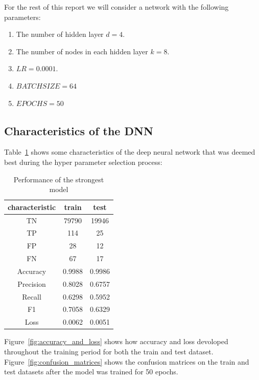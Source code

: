 \documentclass[utf8x]{ctexart}
\begin{document}
For the rest of this report we will consider a network with the following parameters:
\begin{enumerate}
  \item The number of hidden layer $d = 4$.
  \item The number of nodes in each hidden layer $k = 8$.
  \item $LR = 0.0001$.
  \item $BATCH SIZE = 64$
  \item $EPOCHS = 50$
\end{enumerate}

\subsection{Characteristics of the DNN}

Table~\ref{tab:chars} shows some characteristics of the deep neural network that was deemed best during the hyper parameter selection process:

\begin{table}[ht]
  \centering
  \caption{Performance of the strongest model}
  \label{tab:chars}
  \begin{tabular}{c|cc}
    characteristic & train  & test   \\
    \hline
    TN             & 79790  & 19946  \\
    TP             & 114    & 25     \\
    FP             & 28     & 12     \\
    FN             & 67     & 17     \\
    Accuracy       & 0.9988 & 0.9986 \\
    Precision      & 0.8028 & 0.6757 \\
    Recall         & 0.6298 & 0.5952 \\
    F1             & 0.7058 & 0.6329 \\
    Loss           & 0.0062 & 0.0051 \\
  \end{tabular}
\end{table}

Figure~\ref{fig:accuracy_and_loss} shows how accuracy and loss devoloped throughout the training period for both the train and test dataset. Figure~\ref{fig:confusion_matrices} shows the confusion matrices on the train and test datasets after the model was trained for 50 epochs.
\end{document}
